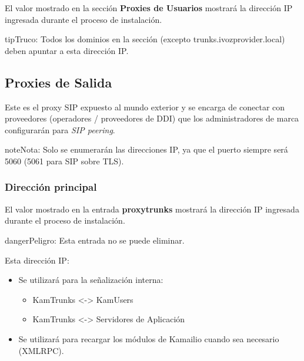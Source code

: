 \documentclass[letterpaper,10pt,spanish]{sphinxmanual}
\begin{document}
El valor mostrado en la sección \textbf{Proxies de Usuarios} mostrará la dirección IP ingresada durante el proceso de instalación.

\begin{notice}{tip}{Truco:}
Todos los dominios en la sección  (excepto trunks.ivozprovider.local) deben apuntar a esta dirección IP.
\end{notice}


\subsection{Proxies de Salida}
\label{administration_portal/platform/infrastructure/proxy_trunks:proxy-trunks}\label{administration_portal/platform/infrastructure/proxy_trunks::doc}\label{administration_portal/platform/infrastructure/proxy_trunks:id1}
Este es el proxy SIP expuesto al mundo exterior y se encarga de conectar con proveedores (operadores / proveedores de DDI) que los administradores de marca configurarán para \emph{SIP peering}.

\begin{notice}{note}{Nota:}
Solo se enumerarán las direcciones IP, ya que el puerto siempre será 5060 (5061 para SIP sobre TLS).
\end{notice}


\subsubsection{Dirección principal}
\label{administration_portal/platform/infrastructure/proxy_trunks:main-address}
El valor mostrado en la entrada \textbf{proxytrunks} mostrará la dirección IP ingresada durante el proceso de instalación.

\begin{notice}{danger}{Peligro:}
Esta entrada no se puede eliminar.
\end{notice}

Esta dirección IP:
\begin{itemize}
\item {} 
Se utilizará para la señalización interna:
\begin{itemize}
\item {} 
KamTrunks \textless{}-\textgreater{} KamUsers

\item {} 
KamTrunks \textless{}-\textgreater{} Servidores de Aplicación

\end{itemize}

\item {} 
Se utilizará para recargar los módulos de Kamailio cuando sea necesario (XMLRPC).

\end{itemize}
\end{document}
